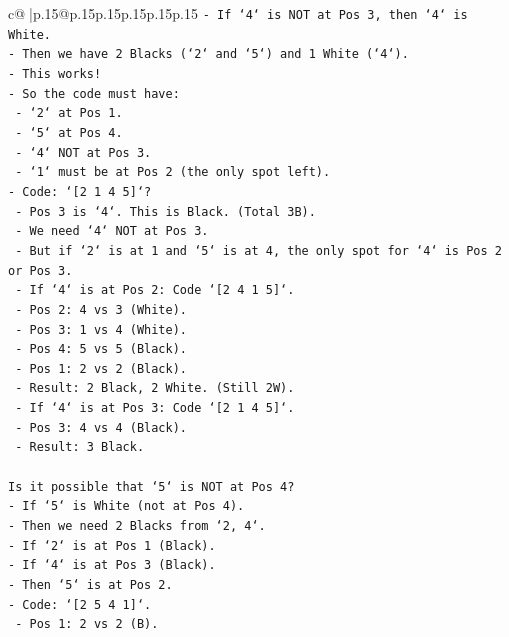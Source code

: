 \documentclass{article}
\begin{document}
{\begin{supertabular}{c@{$\;$}|p{.15\linewidth}@{}p{.15\linewidth}p{.15\linewidth}p{.15\linewidth}p{.15\linewidth}p{.15\linewidth}}
{{{\texttt{{-} If `4` is NOT at Pos 3, then `4` is White.} \\
\texttt{{-} Then we have 2 Blacks (`2` and `5`) and 1 White (`4`).} \\
\texttt{{-} This works!} \\
\texttt{{-} So the code must have:} \\
\texttt{    {-} `2` at Pos 1.} \\
\texttt{    {-} `5` at Pos 4.} \\
\texttt{    {-} `4` NOT at Pos 3.} \\
\texttt{    {-} `1` must be at Pos 2 (the only spot left).} \\
\texttt{{-} Code: `{[}2 1 4 5{]}`?} \\
\texttt{    {-} Pos 3 is `4`. This is Black. (Total 3B).} \\
\texttt{    {-} We need `4` NOT at Pos 3.} \\
\texttt{    {-} But if `2` is at 1 and `5` is at 4, the only spot for `4` is Pos 2 or Pos 3.} \\
\texttt{    {-} If `4` is at Pos 2: Code `{[}2 4 1 5{]}`.} \\
\texttt{        {-} Pos 2: 4 vs 3 (White).} \\
\texttt{        {-} Pos 3: 1 vs 4 (White).} \\
\texttt{        {-} Pos 4: 5 vs 5 (Black).} \\
\texttt{        {-} Pos 1: 2 vs 2 (Black).} \\
\texttt{        {-} Result: 2 Black, 2 White. (Still 2W).} \\
\texttt{    {-} If `4` is at Pos 3: Code `{[}2 1 4 5{]}`.} \\
\texttt{        {-} Pos 3: 4 vs 4 (Black).} \\
\texttt{        {-} Result: 3 Black.} \\
\\ 
\texttt{Is it possible that `5` is NOT at Pos 4?} \\
\texttt{{-} If `5` is White (not at Pos 4).} \\
\texttt{{-} Then we need 2 Blacks from `2, 4`.} \\
\texttt{{-} If `2` is at Pos 1 (Black).} \\
\texttt{{-} If `4` is at Pos 3 (Black).} \\
\texttt{{-} Then `5` is at Pos 2.} \\
\texttt{{-} Code: `{[}2 5 4 1{]}`.} \\
\texttt{    {-} Pos 1: 2 vs 2 (B).} \\
}}}
\end{supertabular}}
\end{document}
